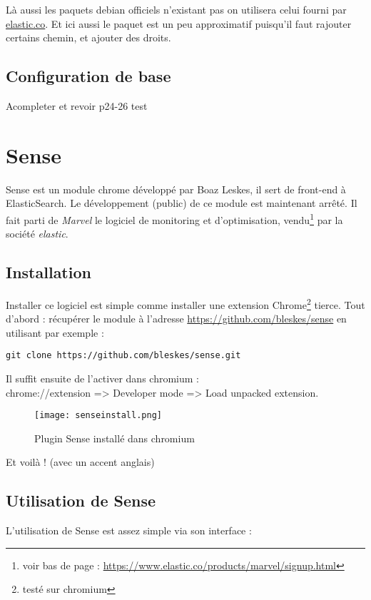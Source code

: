 Là aussi les paquets debian officiels n'existant pas on utilisera celui fourni par 
\href{https://download.elastic.co/elasticsearch/elasticsearch/elasticsearch-1.5.1.deb}{elastic.co}.
Et ici aussi le paquet est un peu approximatif puisqu'il faut rajouter certains 
chemin, et ajouter des droits.

\subsection{Configuration de base}


Acompleter et revoir
p24-26
 test


\section{Sense}
Sense est un module chrome développé par Boaz Leskes, il sert de front-end à ElasticSearch.
Le développement (public) de ce module est maintenant arrêté. Il fait parti de 
\emph{Marvel} le logiciel de monitoring et d'optimisation, vendu\footnote{voir bas 
de page : \url{https://www.elastic.co/products/marvel/signup.html}} 
par la société \emph{elastic}.


\subsection{Installation}
Installer ce logiciel est simple comme installer une extension Chrome\footnote{testé sur chromium}
tierce.
Tout d'abord : récupérer le module à l'adresse \url{https://github.com/bleskes/sense}
en utilisant par exemple : 
\begin{lstlisting}[style=code,label=lst:gitclonesense]
git clone https://github.com/bleskes/sense.git
\end{lstlisting}

Il suffit ensuite de l'activer dans chromium :\\ 
chrome://extension => Developer mode => Load unpacked extension.

\begin{figure}[H]
\center
\texttt{[image: senseinstall.png]}
\label{fig:senseinstall}
\caption{Plugin Sense installé dans chromium}
\end{figure}

Et voilà ! \footnotesize{(avec un accent anglais)}

\subsection{Utilisation de Sense}
L'utilisation de Sense est assez simple via son interface :


